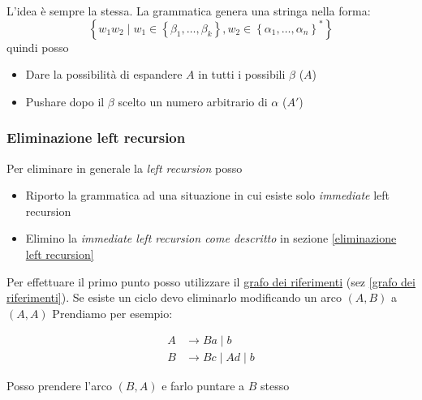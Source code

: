 L'idea è sempre la stessa. La grammatica genera una stringa nella forma:
\[
	\left\{w_1w_2 \mid w_1 \in \left\{\beta_1, \ldots, \beta_k\right\}, w_2 \in \left\{\alpha_1, \ldots, \alpha_n\right\}^{*} \right\}
\]
quindi posso
\begin{itemize}
	\item Dare la possibilità di espandere $ A $ in tutti i possibili $ \beta  $ ($ A $)
	\item Pushare dopo il $ \beta  $ scelto un numero arbitrario di $ \alpha $ ($ A' $)
\end{itemize}
\subsubsection{Eliminazione left recursion}
Per eliminare in generale la \textit{left recursion} posso
\begin{itemize}
	\item Riporto la grammatica ad una situazione in cui esiste solo \textit{immediate} left recursion
	\item Elimino la \textit{immediate left recursion come descritto} in sezione \ref{eliminazione left recursion}
\end{itemize}
Per effettuare il primo punto posso utilizzare il \hyperref[grafo dei riferimenti]{grafo dei riferimenti} (sez \ref{grafo dei riferimenti}). Se esiste un ciclo devo eliminarlo modificando un arco $ \left(A,B\right) $ a $ \left(A, A\right) $
Prendiamo per esempio:
\vskip3mm
\begin{minipage}[c]{0.48\textwidth}
	\begin{align*}
		A & \rightarrow Ba \mid b          \\
		B & \rightarrow  Bc \mid Ad \mid b
	\end{align*}
\end{minipage}
%
\begin{minipage}[c]{0.48\textwidth}
	\centering
\end{minipage}
\vskip3mm
Posso prendere l'arco $ \left(B,A\right) $ e farlo puntare a $ B $ stesso
\begin{center}
\end{center}
